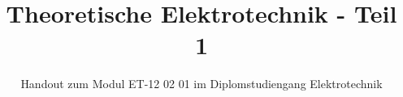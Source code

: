 

\title[Theoretische Elektrotechnik - Teil 1]{Theoretische Elektrotechnik - Teil 1}

\subtitle{Handout zum Modul ET-12 02 01 im Diplomstudiengang Elektrotechnik}

% 
% 

\maketitle

% 
% 


